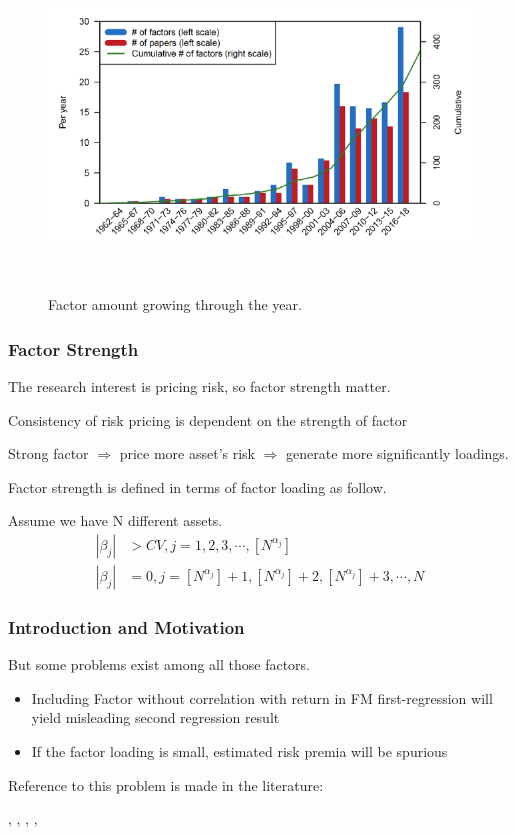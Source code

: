 \documentclass[12pt]{beamer}
\begin{document}
\begin{frame}[plain]
	\begin{figure}
\includegraphics[scale = 0.5]{figure/factor_growth.png}
\caption{Factor amount growing through the year. }
	\cite{Harvey2019}\\
	\end{figure}
\end{frame}



\begin{frame}
	\frametitle{Factor Strength}
	The research interest is pricing risk, so factor strength matter.

	Consistency of risk pricing is dependent on the strength of factor \cite{Pesaran2019}
	


	Strong factor $\Rightarrow$ price more asset's risk $\Rightarrow$ generate more significantly loadings.
	
		Factor strength is defined in terms of factor loading \cite{Bailey2020} as follow.

	 Assume we have N different assets.
	\begin{align*}
	|\beta_j| &> CV , j = 1, 2, 3, \cdots, [N^{\alpha_j}]\\
	|\beta_j |&= 0, j = [N^{\alpha_j} ]+1 ,[N^{\alpha_j}]  +2, [N^{\alpha_j}] +3, \cdots, N
	\end{align*}
\end{frame}
\begin{frame}
\frametitle{Introduction and Motivation}
But some problems exist among all those factors.\\


\begin{itemize}
\item Including Factor without correlation with return in FM first-regression\cite{Fama1973} will yield misleading second regression result \cite{Kan1999}
\item If the factor loading is small, estimated risk premia will be spurious 
\end{itemize}

Reference to this problem is made in the literature:

, , , , 

\end{frame}
\end{document}
